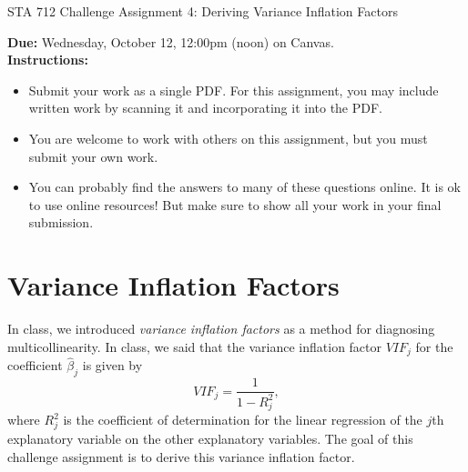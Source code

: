 \documentclass[11pt]{article}
\begin{document}
\begin{center}
\Large
STA 712 Challenge Assignment 4: Deriving Variance Inflation Factors\\
\normalsize
\vspace{5mm}
\end{center}

\noindent \textbf{Due:} Wednesday, October 12, 12:00pm (noon) on Canvas.\\ 

\noindent \textbf{Instructions:} 
\begin{itemize}
\item Submit your work as a single PDF. For this assignment, you may include written work by scanning it and incorporating it into the PDF.
\item You are welcome to work with others on this assignment, but you must submit your own work.
\item You can probably find the answers to many of these questions online. It is ok to use online resources! But make sure to show all your work in your final submission.
\end{itemize}

\section*{Variance Inflation Factors}

In class, we introduced \textit{variance inflation factors} as a method for diagnosing multicollinearity. In class, we said that the variance inflation factor $VIF_j$ for the coefficient $\widehat{\beta}_j$ is given by
$$VIF_j = \dfrac{1}{1 - R^2_j},$$
where $R^2_j$ is the coefficient of determination for the linear regression of the $j$th explanatory variable on the other explanatory variables. The goal of this challenge assignment is to derive this variance inflation factor.
\end{document}
